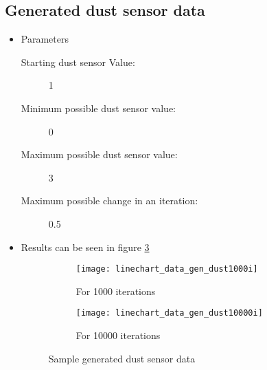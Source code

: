                 \subsection{Generated dust sensor data}
                    \begin{itemize}
                        \item Parameters
                            \begin{description}
                                \item[Starting dust sensor Value:] 1
                                \item[Minimum possible dust sensor value:] 0
                                \item[Maximum possible dust sensor value:] 3
                                \item[Maximum possible change in an iteration:] 0.5
                            \end{description}
                        \item Results can be seen in figure \ref{fig:gen_dust}
                            \begin{figure}
                                \centering
                                \captionsetup{type=figure}
                                \begin{subfigure}[b]{0.45\textwidth}
                                    \centering
                                    \texttt{[image: linechart\_data\_gen\_dust1000i]}
                                    \caption{For 1000 iterations}
                                    \label{chart:gen_dust_1000}
                                \end{subfigure}
                                \hfill
                                \begin{subfigure}[b]{0.45\textwidth}
                                    \centering
                                    \texttt{[image: linechart\_data\_gen\_dust10000i]}
                                    \caption{For 10000 iterations}
                                    \label{chart:gen_dust_10000}
                                \end{subfigure}
                                
                                \caption{Sample generated dust sensor data }
                                \label{fig:gen_dust}
                        \end{figure}
                    \end{itemize}

